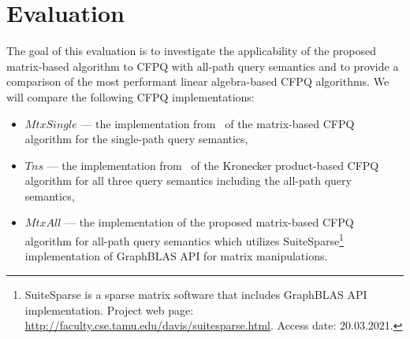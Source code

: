 \section{Evaluation}
The goal of this evaluation is to investigate the applicability of the proposed matrix-based algorithm to CFPQ with all-path query semantics and to provide a comparison of the most performant linear algebra-based CFPQ algorithms. We will compare the following CFPQ implementations:
\begin{itemize}
	\item $MtxSingle$ --- the implementation from~\cite{10.1145/3398682.3399163} of the matrix-based CFPQ algorithm for the single-path query semantics,
	\item $Tns$ --- the implementation from~\cite{kron} of the Kronecker product-based CFPQ algorithm for all three query semantics including the all-path query semantics,
	\item $MtxAll$ --- the implementation of the proposed matrix-based CFPQ algorithm for all-path query semantics which utilizes SuiteSparse\footnote{SuiteSparse is a sparse matrix software that includes GraphBLAS API implementation. Project web page: \url{http://faculty.cse.tamu.edu/davis/suitesparse.html}. Access date: 20.03.2021.}~\cite{Davis2018Algorithm9S} implementation of GraphBLAS API for matrix manipulations.
\end{itemize}


